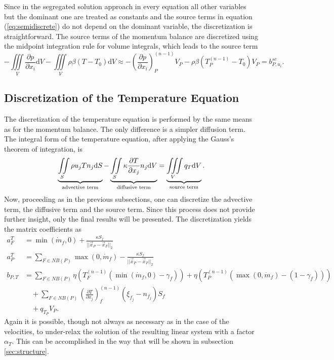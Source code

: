 Since in the segregated solution approach in every equation all other variables but the dominant one are treated as constants and the source terms in equation (\ref{eq:semidiscrete}) do not depend on the dominant variable, the discretization is straightforward. The source terms of the momentum balance are discretized using the midpoint integration rule for volume integrals, which leads to the source term
\begin{displaymath}
  - \iiint\limits_V \frac{\partial p}{\partial x_i} \mathrm{d}V
  - \iiint\limits_V \rho \beta \left(T - T_0\right) \mathrm{d}V
  \approx
  - \left(\frac{\partial p}{\partial x_i}\right)_P^{(n-1)} V_P
  - \rho \beta \left(T_P^{(n-1)} - T_0\right) V_P
  = b_{P,u_i}^{sc}.
\end{displaymath}

\subsection{Discretization of the Temperature Equation}
\label{sec:discretetemperature}

The discretization of the temperature equation is performed by the same means as for the momentum balance. The only difference is a simpler diffusion term. The integral form of the temperature equation, after applying the Gauss's theorem of integration, is
\begin{displaymath}
  \underbrace{ \iint\limits_S \rho u_j T n_j \mathrm{d}S }_{\text{advective term}}
  - \underbrace{ \iint\limits_S \kappa \frac{\partial T}{\partial x_j} n_j \mathrm{d}V }_{\text{diffusive term}}
  = \underbrace{\iiint\limits_V \vphantom{\frac{ T}{ x_j} } q_T \mathrm{d}V }_{\text{source term}}.
\end{displaymath}
Now, proceeding as in the previous subsections, one can discretize the advective term, the diffusive term and the source term. Since this process does not provide further insight, only the final results will be presented. The discretization yields the matrix coefficients as
  \begin{align*}
    a_F^{T} &= \min(\dot{m}_f,0) + \frac{\kappa S_f}{||\vec{x}_P - \vec{x}_F||_2} \\[1em]
    a_P^{T} &= \sum_{F \in NB(P)}\max(0,\dot{m}_f) - \frac{\kappa S_f}{||\vec{x}_P - \vec{x}_F||_2} \\[1em]
    b_{P,T} &= \sum_{F \in NB(P)} \eta  \left(T_F^{(n-1)} \left( \min(\dot{m}_f,0) - \gamma_f \right)\right) 
             + \eta \left( T_{P}^{(n-1)} \left( \max(0,\dot{m}_f) - \left(1 - \gamma_f\right) \right)\right) \nonumber \\[0.5em]
            &\quad + \sum_{F \in NB(P)} \left( \frac{\partial T}{\partial x_j}\right)_f^{(n-1)} \left(\xi_{f_j} - n_{f_j}\right)S_f \nonumber \\[0.5em]
            &\quad + q_{T_P} V_P.
  \end{align*}
Again it is possible, though not always as necessary as in the case of the velocities, to under-relax the solution of the resulting linear system with a factor \(\alpha_T\). This can be accomplished in the way that will be shown in subsection \ref{sec:structure}.

